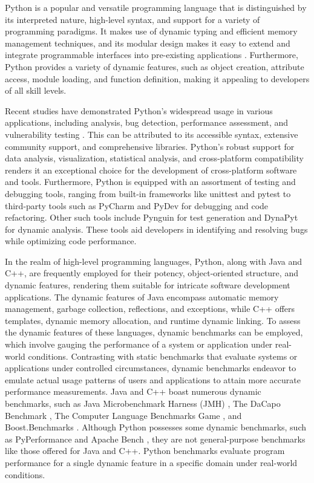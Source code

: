 Python is a popular and versatile programming language that is distinguished by its interpreted nature, high-level syntax, and support for a variety of programming paradigms.
It makes use of dynamic typing and efficient memory management techniques, and its modular design makes it easy to extend and integrate programmable interfaces into pre-existing applications \cite{Python_language_wiki}.
Furthermore, Python provides a variety of dynamic features, such as object creation, attribute access, module loading, and function definition, making it appealing to developers of all skill levels. 

Recent studies have demonstrated Python's widespread usage in various applications, including analysis, bug detection, performance assessment, and vulnerability testing \cite{Python_usage_study1, Python_usage_study2}. This can be attributed to its accessible syntax, extensive community support, and comprehensive libraries. Python's robust support for data analysis, visualization, statistical analysis, and cross-platform compatibility renders it an exceptional choice for the development of cross-platform software and tools. Furthermore, Python is equipped with an assortment of testing and debugging tools, ranging from built-in frameworks like unittest and pytest to third-party tools such as PyCharm \cite{PyCharm} and PyDev \cite{PyDev} for debugging and code refactoring. Other such tools include Pynguin for test generation and DynaPyt for dynamic analysis. These tools aid developers in identifying and resolving bugs while optimizing code performance.

In the realm of high-level programming languages, Python, along with Java and C++, are frequently employed for their potency, object-oriented structure, and dynamic features, rendering them suitable for intricate software development applications. The dynamic features of Java encompass automatic memory management, garbage collection, reflections, and exceptions, while C++ offers templates, dynamic memory allocation, and runtime dynamic linking. To assess the dynamic features of these languages, dynamic benchmarks can be employed, which involve gauging the performance of a system or application under real-world conditions. Contrasting with static benchmarks that evaluate systems or applications under controlled circumstances, dynamic benchmarks endeavor to emulate actual usage patterns of users and applications to attain more accurate performance measurements. Java and C++ boast numerous dynamic benchmarks, such as Java Microbenchmark Harness (JMH) \cite{JMH}, The DaCapo Benchmark \cite{DaCapo_2006}, The Computer Language Benchmarks Game \cite{C++_Benchmark1}, and Boost.Benchmarks \cite{Boost_Benchmarks}. Although Python possesses some dynamic benchmarks, such as PyPerformance \cite{PyPerformance} and Apache Bench \cite{Apache_Benchmark}, they are not general-purpose benchmarks like those offered for Java and C++. Python benchmarks evaluate program performance for a single dynamic feature in a specific domain under real-world conditions.



